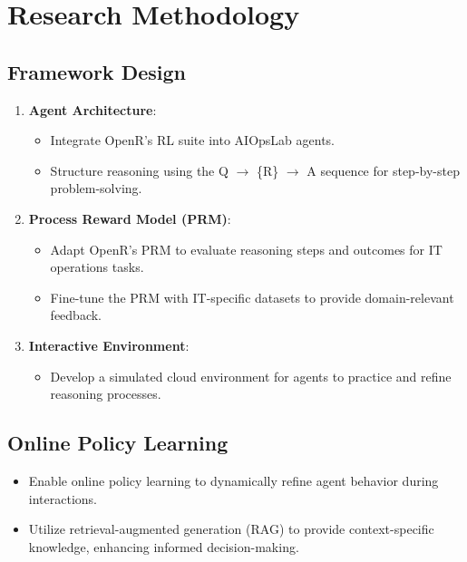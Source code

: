 \documentclass[conference]{IEEEtran}
\begin{document}
\section{Research Methodology}

\subsection{Framework Design}
\begin{enumerate}
    \item \textbf{Agent Architecture}:
    \begin{itemize}
        \item Integrate OpenR's RL suite into AIOpsLab agents.
        \item Structure reasoning using the Q $\rightarrow$ \{R\} $\rightarrow$ A sequence for step-by-step problem-solving.
    \end{itemize}
    
    \item \textbf{Process Reward Model (PRM)}:
    \begin{itemize}
        \item Adapt OpenR's PRM to evaluate reasoning steps and outcomes for IT operations tasks.
        \item Fine-tune the PRM with IT-specific datasets to provide domain-relevant feedback.
    \end{itemize}
    
    \item \textbf{Interactive Environment}:
    \begin{itemize}
        \item Develop a simulated cloud environment for agents to practice and refine reasoning processes.
    \end{itemize}
\end{enumerate}

\subsection{Online Policy Learning}
\begin{itemize}
    \item Enable online policy learning to dynamically refine agent behavior during interactions.
    \item Utilize retrieval-augmented generation (RAG) to provide context-specific knowledge, enhancing informed decision-making.
\end{itemize}
\end{document}
